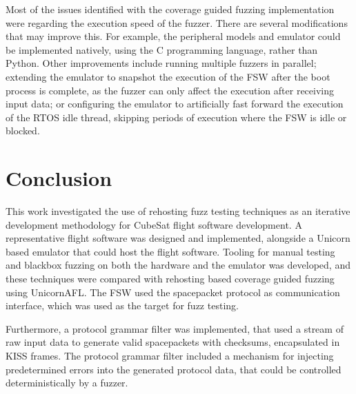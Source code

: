 \documentclass[../report.tex]{subfiles}
\begin{document}
Most of the issues identified with the coverage guided fuzzing implementation
were regarding the execution speed of the fuzzer. There are several
modifications that may improve this. For example, the peripheral models and
emulator could be implemented natively, using the C programming language,
rather than Python. Other improvements include running multiple fuzzers in
parallel; extending the emulator to snapshot the execution of the FSW after the
boot process is complete, as the fuzzer can only affect the execution after
receiving input data; or configuring the emulator to artificially fast forward
the execution of the RTOS idle thread, skipping periods of execution where the
FSW is idle or blocked.






\section{Conclusion}
This work investigated the use of rehosting fuzz testing techniques as an
iterative development methodology for CubeSat flight software development. A
representative flight software was designed and implemented, alongside a
Unicorn based emulator that could host the flight software. Tooling for manual
testing and blackbox fuzzing on both the hardware and the emulator was
developed, and these techniques were compared with rehosting based coverage
guided fuzzing using UnicornAFL. The FSW used the spacepacket protocol as
communication interface, which was used as the target for fuzz testing.

Furthermore, a protocol grammar filter was implemented, that used a stream of
raw input data to generate valid spacepackets with checksums, encapsulated in
KISS frames. The protocol grammar filter included a mechanism for injecting
predetermined errors into the generated protocol data, that could be controlled
deterministically by a fuzzer.
\end{document}
